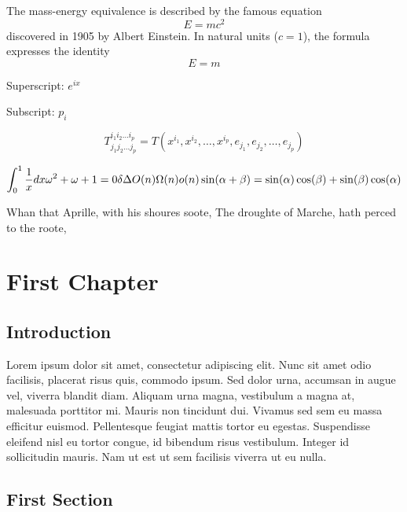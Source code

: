 \documentclass[12pt, a4paper]{report}
\begin{document}
The mass-energy equivalence is described by the famous equation \[E=mc^2 \] discovered in 1905 by Albert Einstein.
In natural units ($c = 1$), the formula expresses the identity
\begin{equation}
E=m
\end{equation}

Superscript: $e^{ix}$

Subscript: $p_i$

\[T^{i_1 i_2 \dots i_p}_{j_1 j_2 \dots j_p} = T(x^{i_1}, x^{i_2}, \dots, x^{i_p}, e_{j_1}, e_{j_2}, \dots, e_{j_p}) \]

\begin{equation*}
\int_0^1 \frac{1}{x} dx \\
\omega^2 + \omega + 1 = 0 \\
\delta \Delta \\
O(n) \Omega(n) o(n) \\
\sin(\alpha+\beta) = \sin(\alpha)\cos(\beta) + \sin(\beta)\cos(\alpha)
\end{equation*}

Whan that Aprille, with his shoures soote,\newline
The droughte of Marche, hath perced to the roote,

\chapter{First Chapter}

\section{Introduction}

Lorem ipsum dolor sit amet, consectetur adipiscing elit. Nunc sit amet odio facilisis, placerat risus quis, commodo ipsum. Sed dolor urna, accumsan in augue vel, viverra blandit diam. Aliquam urna magna, vestibulum a magna at, malesuada porttitor mi. Mauris non tincidunt dui. Vivamus sed sem eu massa efficitur euismod. Pellentesque feugiat mattis tortor eu egestas. Suspendisse eleifend nisl eu tortor congue, id bibendum risus vestibulum. Integer id sollicitudin mauris. Nam ut est ut sem facilisis viverra ut eu nulla.

\section{First Section}
\end{document}
